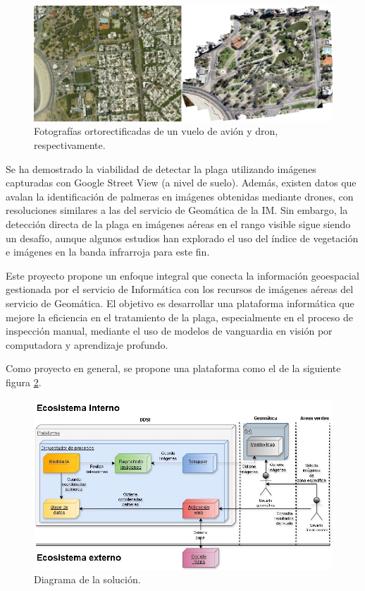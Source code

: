 \documentclass[
11pt, %
]{charter}
\begin{document}
\begin{figure}[H]
  \centering
  \includegraphics[width=.95\textwidth]{./Figuras/imagen-dron-y-avion.png}
  \caption{Fotografías ortorectificadas de un vuelo de avión y dron, respectivamente.}
  \label{fig:imagen-dron-y-avion}
\end{figure}

Se ha demostrado la viabilidad de detectar la plaga utilizando imágenes capturadas con Google Street View (a nivel de suelo)\cite{kagan2024}. Además, existen datos que avalan la identificación de palmeras en imágenes obtenidas mediante drones, con resoluciones similares a las del servicio de Geomática de la IM. Sin embargo, la detección directa de la plaga en imágenes aéreas en el rango visible sigue siendo un desafío, aunque algunos estudios han explorado el uso del índice de vegetación e imágenes en la banda infrarroja para este fin\cite{delalieux2023}.

Este proyecto propone un enfoque integral que conecta la información geoespacial gestionada por el servicio de Informática con los recursos de imágenes aéreas del servicio de Geomática. El objetivo es desarrollar una plataforma informática que mejore la eficiencia en el tratamiento de la plaga, especialmente en el proceso de inspección manual, mediante el uso de modelos de vanguardia en visión por computadora y aprendizaje profundo.

Como proyecto en general, se propone una plataforma como el de la siguiente figura \ref{fig:diagrama-inicial-solucion}.

\begin{figure}[H]
  \centering
  \includegraphics[width=.95\textwidth]{./Figuras/diagrama-inicial-solucion.jpg}
  \caption{Diagrama de la solución.}
  \label{fig:diagrama-inicial-solucion}
\end{figure}
\end{document}
